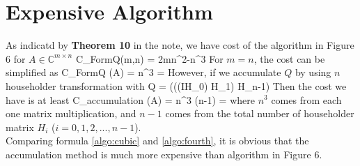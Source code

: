 \documentclass[11pt,a4paper]{article}
\begin{document}
\section{Expensive Algorithm}
As indicatd by {\bf Theorem 10} in the note, we have cost of the algorithm in
Figure 6 for $A\in\mathbb{C}^{m\times n}$ 
\be
C_{FormQ}(m,n)  = 2mn^2-n^3
\ee
For $m = n$, the cost can be simplified as 
\be
C_{FormQ} (A) =  n^3 =  \label{algo:cubic}
\ee
However, if we accumulate $Q$ by using $n$ householder transformation with 
\be
Q = (\hdots((IH_0) H_1) \hdots H_{n-1})
\ee
Then the cost we have is at least 
\be
C_{accumulation} (A) = n^3 \cdot (n-1) =  \label{algo:fourth}
\ee
where $n^3$ comes from each one matrix multiplication, and $n-1$ comes from
the total number of householder matrix $H_i$ ($i=0,1,2,...,n-1 $). \\
Comparing formula \eqref{algo:cubic} and \eqref{algo:fourth}, it is obvious
that the accumulation method is much more expensive than algorithm in Figure
6. 

\end{document}
